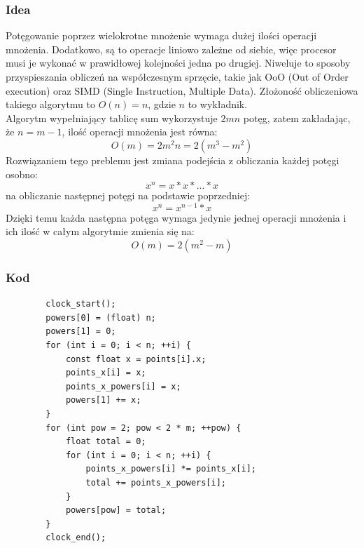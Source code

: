 \documentclass{article}
\begin{document}
	\subsubsection{Idea}
	Potęgowanie poprzez wielokrotne mnożenie wymaga dużej ilości operacji mnożenia.
	Dodatkowo, są to operacje liniowo zależne od siebie, więc procesor musi je wykonać w prawidłowej kolejności jedna po drugiej. Niweluje to sposoby przyspieszania obliczeń na współczesnym sprzęcie, takie jak OoO (Out of Order execution) oraz SIMD (Single Instruction, Multiple Data).
	Złożoność obliczeniowa takiego algorytmu to $O(n) = n$, gdzie $n$ to wykładnik.\\
	Algorytm wypełniający tablicę sum wykorzystuje $2mn$ potęg, zatem zakładając, że $n = m-1$, ilość operacji mnożenia jest równa:
	\begin{equation}
		O(m) = 2m^2n = 2(m^3 - m^2)
	\end{equation}
	Rozwiązaniem tego preblemu jest zmiana podejścia z obliczania każdej potęgi osobno:
	\begin{equation}
		x^n = x*x*...*x
	\end{equation}
	na obliczanie następnej potęgi na podstawie poprzedniej:
	\begin{equation}
		x^n = x^{n-1}*x
	\end{equation}
	Dzięki temu każda następna potęga wymaga jedynie jednej operacji mnożenia i ich ilość w całym algorytmie zmienia się na:
	\begin{equation}
		O(m) = 2(m^2 - m)
	\end{equation}
	
	\subsubsection{Kod}
	\begin{verbatim}
		clock_start();
		powers[0] = (float) n;
		powers[1] = 0;
		for (int i = 0; i < n; ++i) {
			const float x = points[i].x;
			points_x[i] = x;
			points_x_powers[i] = x;
			powers[1] += x;
		}
		for (int pow = 2; pow < 2 * m; ++pow) {
			float total = 0;
			for (int i = 0; i < n; ++i) {
				points_x_powers[i] *= points_x[i];
				total += points_x_powers[i];
			}
			powers[pow] = total;
		}
		clock_end();
	\end{verbatim}
	
\end{document}
